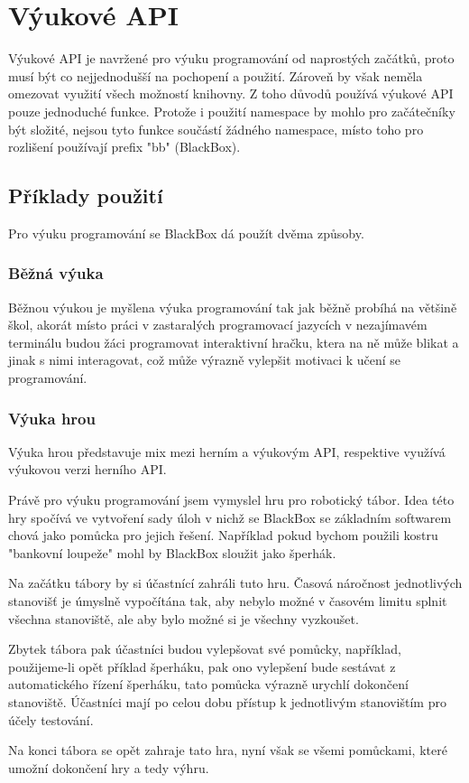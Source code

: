 \chapter{Výukové API}

Výukové API je navržené pro výuku programování od naprostých začátků, proto musí být co nejjednodušší na pochopení a použití.
Zároveň by však neměla omezovat využití všech možností knihovny.
Z toho důvodů používá výukové API pouze jednoduché funkce.
Protože i použití namespace by mohlo pro začátečníky být složité, nejsou tyto funkce součástí žádného namespace, místo toho pro rozlišení používají prefix "bb" (BlackBox).



\section{Příklady použití}

Pro výuku programování se BlackBox dá použít dvěma způsoby.

\subsection{Běžná výuka}

Běžnou výukou je myšlena výuka programování tak jak běžně probíhá na většině škol, akorát místo práci v zastaralých programovací jazycích v nezajímavém terminálu budou žáci programovat interaktivní hračku, ktera na ně může blikat a jinak s nimi interagovat, což může výrazně vylepšit motivaci k učení se programování.

\subsection{Výuka hrou}

Výuka hrou představuje mix mezi herním a výukovým API, respektive využívá výukovou verzi herního API.

Právě pro výuku programování jsem vymyslel hru pro robotický tábor.
Idea této hry spočívá ve vytvoření sady úloh v nichž se BlackBox se základním softwarem chová jako pomůcka pro jejich řešení.
Například pokud bychom použili kostru "bankovní loupeže" mohl by BlackBox sloužit jako šperhák.

Na začátku tábory by si účastnící zahráli tuto hru.
Časová náročnost jednotlivých stanovišť je úmyslně vypočítána tak, aby nebylo možné v časovém limitu splnit všechna stanoviště, ale aby bylo možné si je všechny vyzkoušet.

Zbytek tábora pak účastníci budou vylepšovat své pomůcky, například, použijeme-li opět příklad šperháku, pak ono vylepšení bude sestávat z automatického řízení šperháku, tato pomůcka výrazně urychlí dokončení stanoviště.
Účastníci mají po celou dobu přístup k jednotlivým stanovištím pro účely testování.

Na konci tábora se opět zahraje tato hra, nyní však se všemi pomůckami, které umožní dokončení hry a tedy výhru.
